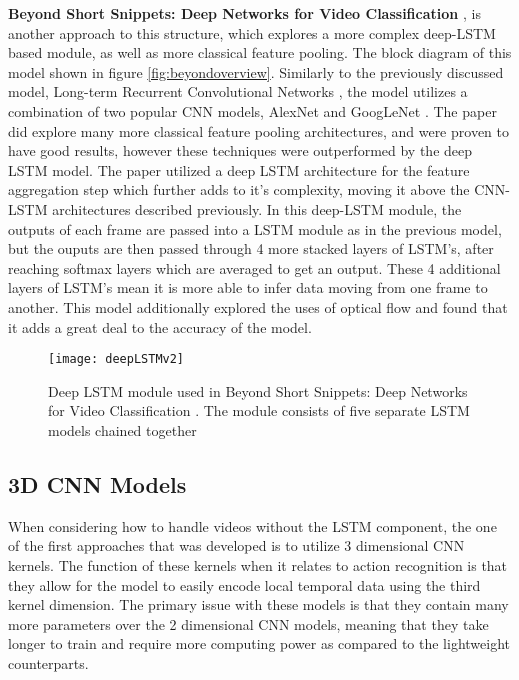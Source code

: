 \textbf{Beyond Short Snippets: Deep Networks for Video Classification} \cite{beyondshortsnippets}, is another approach to this structure, which explores a more complex deep-LSTM based module, as well as more classical feature pooling. The block diagram of this model shown in figure \ref{fig:beyondoverview}. Similarly to the previously discussed model, Long-term Recurrent Convolutional Networks \cite{LRCNS}, the model utilizes a combination of two popular CNN models, AlexNet \cite{alexnet} and GoogLeNet \cite{googlenet}. The paper did explore many more classical feature pooling architectures, and were proven to have good results, however these techniques were outperformed by the deep LSTM model. The paper utilized a deep LSTM architecture for the feature aggregation step which further adds to it's complexity, moving it above the CNN-LSTM architectures described previously. In this deep-LSTM module, the outputs of each frame are passed into a LSTM module as in the previous model, but the ouputs are then passed  through 4 more stacked layers of LSTM's, after reaching softmax layers which are averaged to get an output. These 4 additional layers of LSTM's mean it is more able to infer data moving from one frame to another. This model additionally explored the uses of optical flow and found that it adds a great deal to the accuracy of the model.

\begin{figure}[ht]
	\texttt{[image: deepLSTMv2]}
	\centering
	\caption{Deep LSTM module used in Beyond Short Snippets: Deep Networks for Video Classification \cite{beyondshortsnippets}. The module consists of five separate LSTM models chained together }
	\label{fig:deepLSTM}
\end{figure}

\subsection{3D CNN Models}
\label{sec:3dCNNModels}

When considering how to handle videos without the LSTM component, the one of the first approaches that was developed is to utilize 3 dimensional CNN kernels. The function of these kernels when it relates to action recognition is that they allow for the model to easily encode local temporal data using the third kernel dimension. The primary issue with these models is that they contain many more parameters over the 2 dimensional CNN models, meaning that they take longer to train and require more computing power as compared to the lightweight counterparts.

